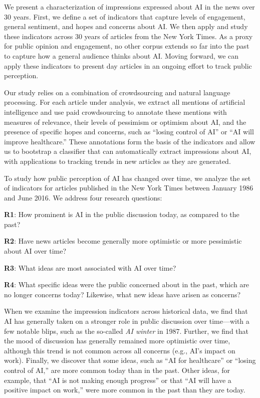 \documentclass[letterpaper]{article}
\begin{document}
We present a characterization of impressions expressed about AI in the news over 30 years. First, we define a set of indicators that capture levels of engagement, general sentiment, and hopes and concerns about AI. We then apply and study these indicators across 30 years of articles from the New York Times. As a proxy for public opinion and engagement, no other corpus extends so far into the past to capture how a general audience thinks about AI. Moving forward, we can apply these indicators to present day articles in an ongoing effort to track public perception.

Our study relies on a combination of crowdsourcing and natural language processing. For each article under analysis, we extract all mentions of artificial intelligence and use paid crowdsourcing to annotate these mentions with measures of relevance, their levels of pessimism or optimism about AI, and the presence of specific hopes and concerns, such as ``losing control of AI'' or ``AI will improve healthcare.'' These annotations form the basis of the indicators and allow us to bootstrap a classifier that can automatically extract impressions about AI, with applications to tracking trends in new articles as they are generated.

To study how public perception of AI has changed over time, we analyze the set of indicators for articles published in the New York Times between January 1986 and June 2016. We address four research questions:

\textbf{R1}: How prominent is AI in the public discussion today, as compared to the past? %

\textbf{R2}: Have news articles become generally more optimistic or more pessimistic about AI over time? %

\textbf{R3}: What ideas are most associated with AI over time? %

\textbf{R4}: What specific ideas were the public concerned about in the past, which are no longer concerns today? Likewise, what new ideas have arisen as concerns?

When we examine the impression indicators across historical data, we find that AI has generally taken on a stronger role in public discussion over time---with a few notable blips, such as the so-called \textit{AI winter} in 1987. Further, we find that the mood of discussion has generally remained more optimistic over time, although this trend is not common across all concerns (e.g., AI's impact on work). Finally, we discover that some ideas, such as ``AI for healthcare'' or ``losing control of AI,'' are more common today than in the past. Other ideas, for example, that ``AI is not making enough progress'' or that ``AI will have a positive impact on work,'' were more common in the past than they are today.
\end{document}
